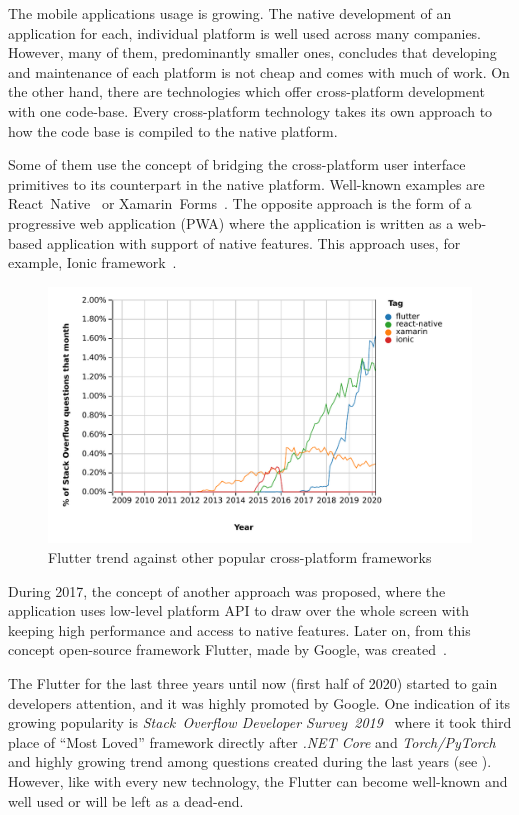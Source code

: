 \begin{introduction}
The mobile applications usage is growing. The native development of an application for each, individual platform is well used across many companies. However, many of them, predominantly smaller ones, concludes that developing and maintenance of each platform is not cheap and comes with much of work. On the other hand, there are technologies which offer cross-platform development with one code-base. Every cross-platform technology takes its own approach to how the code base is compiled to the native platform. 

Some of them use the concept of bridging the cross-platform user interface primitives to its counterpart in the native platform. Well-known examples are React~Native~\cite{react-native} or Xamarin~Forms~\cite{xamarin-forms}. The opposite approach is the form of a progressive web application (PWA) where the application is written as a web-based application with support of native features. This approach uses, for example, Ionic framework~\cite{ionic}. 

\begin{figure}[htp]
    \centering
    \includegraphics[width=0.9\linewidth]{img/introduction/so-flutter-trend.pdf}
    \caption{Flutter trend against other popular cross-platform frameworks~\cite{so-flutter-trend}}
    \label{fig:so-flutter-trend}
\end{figure}

During 2017, the concept of another approach was proposed, where the application uses low-level platform API to draw over the whole screen with keeping high performance and access to native features. Later on, from this concept open-source framework Flutter, made by Google,  was created~\cite{flutter}. 

The Flutter for the last three years until now (first half of 2020) started to gain developers attention, and it was highly promoted by Google. One indication of its growing popularity is \textit{Stack~Overflow Developer Survey~2019}~\cite{so-2019-survey} where it took third place of ``Most Loved'' framework directly after \textit{.NET Core} and \textit{Torch/PyTorch} and highly growing trend among questions created during the last years (see ). However, like with every new technology, the Flutter can become well-known and well used or will be left as a dead-end. 


\end{introduction}
